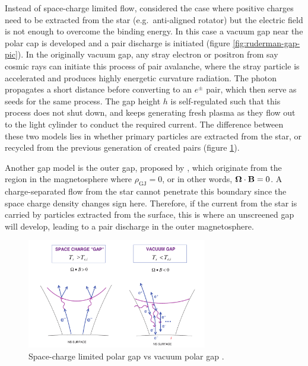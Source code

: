 Instead of space-charge limited flow, \citet{ruderman_theory_1975} considered
the case where positive charges need to be extracted from the star (e.g.\
anti-aligned rotator) but the electric field is not enough to overcome the
binding energy. In this case a vacuum gap near the polar cap is developed and a
pair discharge is initiated (figure \ref{fig:ruderman-gap-pic}). In the
originally vacuum gap, any stray electron or positron from say cosmic rays can
initiate this process of pair avalanche, where the stray particle is accelerated
and produces highly energetic curvature radiation. The photon propagates a short
distance before converting to an $e^{\pm}$ pair, which then serve as seeds for
the same process. The gap height $h$ is self-regulated such that this process
does not shut down, and keeps generating fresh plasma as they flow out to the
light cylinder to conduct the required current. The difference between these two
models lies in whether primary particles are extracted from the star, or
recycled from the previous generation of created pairs (figure
\ref{fig:polar-gaps}).

Another gap model is the outer gap, proposed by \citet{cheng_energetic_1986},
which originate from the region in the magnetosphere where $\rho_\mathrm{GJ} =
0$, or in other words, $\bm{\Omega}\cdot \mathbf{B} = 0$. A charge-separated flow from
the star cannot penetrate this boundary since the space charge density changes
sign here. Therefore, if the current from the star is carried by particles
extracted from the surface, this is where an unscreened gap will develop,
leading to a pair discharge in the outer magnetosphere.

\begin{figure}[h]
  \centering
  \includegraphics[width=0.7\textwidth]{pics/intro/polar-gaps.png}
  \caption[Space-charge limited polar gap and vacuum polar gap.]{Space-charge
    limited polar gap vs vacuum polar gap \citep{harding_high-energy_2009}.}
  \label{fig:polar-gaps}
\end{figure}


